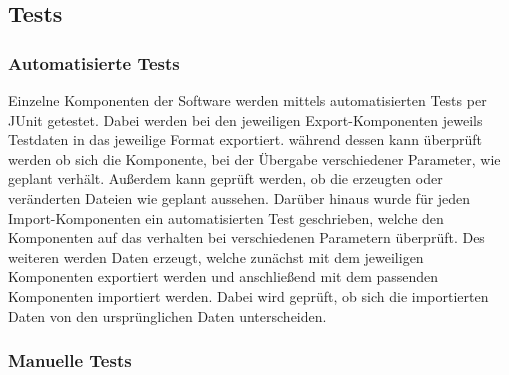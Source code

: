 \subsection{Tests}
\subsubsection{Automatisierte Tests}
Einzelne Komponenten der Software werden mittels automatisierten Tests per JUnit getestet. Dabei werden bei den jeweiligen Export-Komponenten jeweils Testdaten in das jeweilige Format exportiert. während dessen kann überprüft werden ob sich die Komponente, bei der Übergabe verschiedener Parameter, wie geplant verhält. Außerdem kann geprüft werden, ob die erzeugten oder veränderten Dateien wie geplant aussehen. Darüber hinaus wurde für jeden Import-Komponenten ein automatisierten Test geschrieben, welche den Komponenten auf das verhalten bei verschiedenen Parametern überprüft. Des weiteren werden Daten erzeugt, welche zunächst mit dem jeweiligen Komponenten exportiert werden und anschließend mit dem passenden Komponenten importiert werden. Dabei wird geprüft, ob sich die importierten Daten von den ursprünglichen Daten unterscheiden.

\subsubsection{Manuelle Tests}